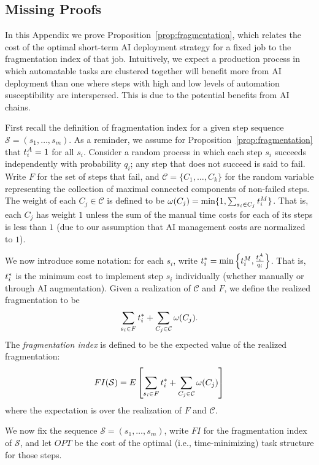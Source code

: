\subsection{Missing Proofs}

In this Appendix we prove Proposition~\ref{prop:fragmentation}, which relates the cost of the optimal short-term AI deployment strategy for a fixed job to the fragmentation index of that job.
Intuitively, we expect a production process in which automatable tasks are clustered together will benefit more from AI deployment than one where steps with high and low levels of automation susceptibility are interspersed.  
This is due to the potential benefits from AI chains.

First recall the definition of fragmentation index for a given step sequence $\mathcal{S} = (s_1, \dotsc, s_m)$.  
As a reminder, we assume for Proposition~\ref{prop:fragmentation} that $t^{A}_{i} = 1$ for all $s_i$.  
Consider a random process in which each step $s_i$ succeeds independently with probability $q_i$; any step that does not succeed is said to fail.  
Write $F$ for the set of steps that fail, and $\mathcal{C} = \{C_1, \dotsc, C_k\}$ for the random variable representing the collection of maximal connected components of non-failed steps.  
The weight of each $C_j \in \mathcal{C}$ is defined to be $\omega(C_j) = \min\{ 1, \sum_{s_i \in C_j} t^{M}_{i} \}$.  
That is, each $C_j$ has weight $1$ unless the sum of the manual time costs for each of its steps is less than $1$ (due to our assumption that AI management costs are normalized to $1$).

We now introduce some notation: for each $s_i$, write $t^*_{i} = \min\left\{t^{M}_{i}, \frac{t^{A}_{i}}{q_i}\right\}$.  That is, $t^*_{i}$ is the minimum cost to implement step $s_i$ individually (whether manually or through AI augmentation).  
Given a realization of $\mathcal{C}$ and $F$, we define the realized fragmentation to be 
\[ \sum_{s_i \in F}t^*_{i} + \sum_{C_j \in \mathcal{C}} \omega(C_j).\]
The \emph{fragmentation index} is defined to be the expected value of the realized fragmentation:
\[ FI(\mathcal{S}) = E\left[ \sum_{s_i \in F}t^*_{i} + \sum_{C_j \in \mathcal{C}} \omega(C_j) \right] \]
where the expectation is over the realization of $F$ and $\mathcal{C}$.

We now fix the sequence $\mathcal{S} = (s_1, \dotsc, s_m)$, write $FI$ for the fragmentation index of $\mathcal{S}$, and let $OPT$ be the cost of the optimal (i.e., time-minimizing) task structure for those steps.  

